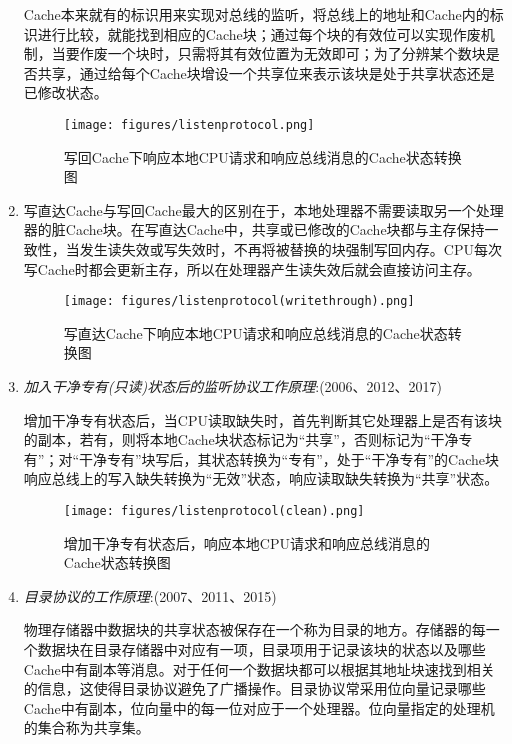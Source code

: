 \documentclass[a4paper]{ctexbook}
\begin{document}
\begin{enumerate}
  Cache本来就有的标识用来实现对总线的监听，将总线上的地址和Cache内的标识进行比较，就能找到相应的Cache块；通过每个块的有效位可以实现作废机制，当要作废一个块时，只需将其有效位置为无效即可；为了分辨某个数块是否共享，通过给每个Cache块增设一个共享位来表示该块是处于共享状态还是已修改状态。
    
  \begin{figure}[H]
    \centering
    \caption{写回Cache下响应本地CPU请求和响应总线消息的Cache状态转换图}
    \texttt{[image: figures/listenprotocol.png]}
  \end{figure}
  
  \item 写直达Cache与写回Cache最大的区别在于，本地处理器不需要读取另一个处理器的脏Cache块。在写直达Cache中，共享或已修改的Cache块都与主存保持一致性，当发生读失效或写失效时，不再将被替换的块强制写回内存。CPU每次写Cache时都会更新主存，所以在处理器产生读失效后就会直接访问主存。
  
  \begin{figure}[H]
    \centering
    \caption{写直达Cache下响应本地CPU请求和响应总线消息的Cache状态转换图}
    \texttt{[image: figures/listenprotocol(writethrough).png]}
  \end{figure}
  
  \item \emph{加入干净专有(只读)状态后的监听协议工作原理}:(2006、2012、2017)
  
  增加干净专有状态后，当CPU读取缺失时，首先判断其它处理器上是否有该块的副本，若有，则将本地Cache块状态标记为“共享”，否则标记为“干净专有”；对“干净专有”块写后，其状态转换为“专有”，处于“干净专有”的Cache块响应总线上的写入缺失转换为“无效”状态，响应读取缺失转换为“共享”状态。
  
  \begin{figure}[H]
    \centering
    \caption{增加干净专有状态后，响应本地CPU请求和响应总线消息的Cache状态转换图}
    \texttt{[image: figures/listenprotocol(clean).png]}
  \end{figure}
  
  
  \item \emph{目录协议的工作原理}:(2007、2011、2015)
  
  物理存储器中数据块的共享状态被保存在一个称为目录的地方。存储器的每一个数据块在目录存储器中对应有一项，目录项用于记录该块的状态以及哪些Cache中有副本等消息。对于任何一个数据块都可以根据其地址块速找到相关的信息，这使得目录协议避免了广播操作。目录协议常采用位向量记录哪些Cache中有副本，位向量中的每一位对应于一个处理器。位向量指定的处理机的集合称为共享集。


\end{enumerate}
\end{document}
